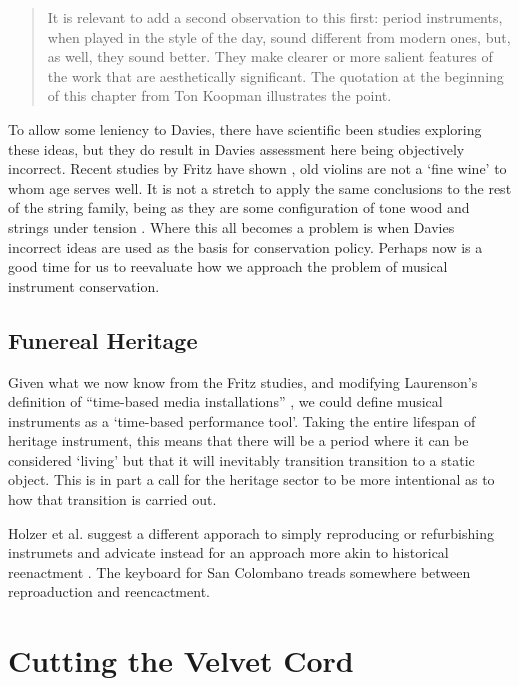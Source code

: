 \begin{quotation}
It is relevant to add a second observation to this first: period instruments, when played in the style of the day, sound different from modern ones, but, as well, they sound better. They make clearer or more salient features of the work that are aesthetically significant. The quotation at the beginning of this chapter from Ton Koopman illustrates the point.
\end{quotation}

To allow some leniency to Davies, there have scientific been studies exploring these ideas, but they do result in Davies assessment here being objectively incorrect.
Recent studies by Fritz have shown \cite{fritz_player_2012, fritz_soloist_2014, fritz_listener_2017}, old violins are not a `fine wine' to whom age serves well. 
It is not a stretch to apply the same conclusions to the rest of the string family, being as they are some configuration of tone wood and strings under tension \cite{carcagno_guitar_2017}.
Where this all becomes a problem is when Davies incorrect ideas are used as the basis for conservation policy.
Perhaps now is a good time for us to reevaluate how we approach the problem of musical instrument conservation.

\subsection{Funereal Heritage}

Given what we now know from the Fritz studies, and modifying Laurenson's definition of ``time-based media installations'' \cite{laurenson_management_2005}, we could define musical instruments as a `time-based performance tool'. Taking the entire lifespan of heritage instrument, this means that there will be a period where it can be considered `living' but that it will inevitably transition transition to a static object. This is in part a call for the heritage sector to be more intentional as to how that transition is carried out.

Holzer et al. suggest a different apporach to simply reproducing or refurbishing instrumets and advicate instead for an approach more akin to historical reenactment \cite{holzer_imperfect_2025}. The keyboard for San Colombano treads somewhere between reproaduction and reencactment.


\section{Cutting the Velvet Cord}

